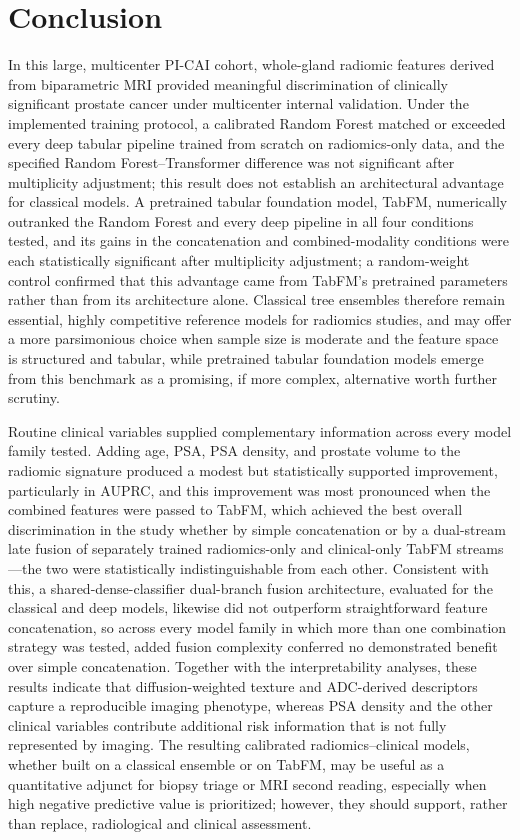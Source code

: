 \documentclass[11pt]{article}
\begin{document}
\section{Conclusion}
\label{sec:conclusion}

In this large, multicenter PI-CAI cohort, whole-gland radiomic features derived
from biparametric MRI provided meaningful discrimination of clinically
significant prostate cancer under multicenter internal validation. Under the
implemented training protocol, a calibrated Random Forest matched or exceeded
every deep tabular pipeline trained from scratch on radiomics-only data, and
the specified Random Forest--Transformer difference was not significant after
multiplicity adjustment; this result does not establish an architectural
advantage for classical models. A pretrained tabular foundation model, TabFM,
numerically outranked the Random Forest and every deep pipeline in all four
conditions tested, and its gains in the concatenation and combined-modality
conditions were each statistically significant after multiplicity adjustment;
a random-weight control confirmed that this advantage came from TabFM's
pretrained parameters rather than from its architecture alone. Classical tree
ensembles therefore remain essential, highly competitive reference models for
radiomics studies, and may offer a more parsimonious choice when sample size is
moderate and the feature space is structured and tabular, while pretrained
tabular foundation models emerge from this benchmark as a promising, if more
complex, alternative worth further scrutiny.

Routine clinical variables supplied complementary information across every
model family tested. Adding age, PSA, PSA density, and prostate volume to the
radiomic signature produced a modest but statistically supported improvement,
particularly in AUPRC, and this improvement was most pronounced when the
combined features were passed to TabFM, which achieved the best overall
discrimination in the study whether by simple concatenation or by a
dual-stream late fusion of separately trained radiomics-only and clinical-only
TabFM streams---the two were statistically indistinguishable from each other.
Consistent with this, a shared-dense-classifier dual-branch fusion
architecture, evaluated for the classical and deep models, likewise did not
outperform straightforward feature concatenation, so across every model family
in which more than one combination strategy was tested, added fusion
complexity conferred no demonstrated benefit over simple concatenation.
Together with the interpretability analyses, these results
indicate that diffusion-weighted texture and ADC-derived descriptors capture a
reproducible imaging phenotype, whereas PSA density and the other clinical
variables contribute additional risk information that is not fully represented
by imaging. The resulting calibrated radiomics--clinical models, whether built
on a classical ensemble or on TabFM, may be useful as a quantitative adjunct for
biopsy triage or MRI second reading, especially when high negative predictive
value is prioritized; however, they should support, rather than replace,
radiological and clinical assessment.
\end{document}
